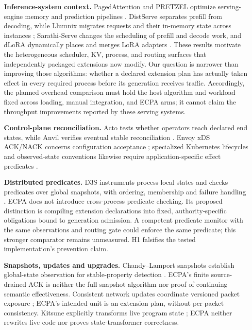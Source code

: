 \documentclass[letterpaper,twocolumn,10pt]{article}
\begin{document}
\textbf{Inference-system context.}  PagedAttention and PRETZEL optimize
serving-engine memory and prediction pipelines
\cite{vllm-pagedattention,pretzel}.  DistServe separates prefill from decoding,
while Llumnix migrates requests and their in-memory state across instances
\cite{distserve,llumnix}; Sarathi-Serve changes the scheduling of prefill and
decode work, and dLoRA dynamically places and merges LoRA adapters
\cite{sarathi-serve,dlora}.  These results motivate the heterogeneous
scheduler, KV, process, and routing surfaces that independently packaged
extensions now modify.  Our question is narrower than improving those
algorithms: whether a declared extension plan has actually taken effect in
every required process before its generation receives traffic.  Accordingly,
the planned overhead comparison must hold the host algorithm and workload
fixed across loading, manual integration, and ECPA arms; it cannot claim the throughput
improvements reported by these serving systems.

\textbf{Control-plane reconciliation.}  Acto tests whether operators reach
declared end states, while Anvil verifies eventual stable reconciliation
\cite{acto,anvil}.  Envoy xDS ACK/NACK concerns configuration acceptance
\cite{envoy-xds}; specialized Kubernetes lifecycles and observed-state
conventions likewise require application-specific effect predicates
\cite{k8s-device-plugin,csi-spec,k8s-api-conventions}.

\textbf{Distributed predicates.} D3S instruments process-local states and checks
predicates over global snapshots, with ordering, membership and failure handling
\cite{d3s}. ECPA does not introduce cross-process predicate checking. Its proposed
distinction is compiling extension declarations into fixed, authority-specific
obligations bound to generation admission. A competent predicate monitor with
the same observations and routing gate could enforce the same predicate; this
stronger comparator remains unmeasured. H1 falsifies the tested implementation's
prevention claim.

\textbf{Snapshots, updates and upgrades.} Chandy--Lamport snapshots establish
global-state observation for stable-property detection \cite{chandy-lamport-snapshot}.
ECPA's finite source-drained ACK is neither the full snapshot algorithm nor proof
of continuing semantic effectiveness. Consistent network updates coordinate
versioned packet exposure \cite{reitblatt-update}; ECPA's intended unit is an
extension plan, without per-packet consistency. Kitsune explicitly transforms
live program state \cite{kitsune}; ECPA neither rewrites live code nor proves
state-transformer correctness.
\end{document}
